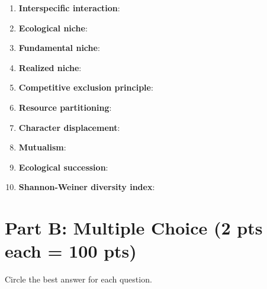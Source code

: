 \documentclass[11pt]{article}
\begin{document}
\begin{enumerate}[label=\textbf{\arabic*.}]
  \item \textbf{Interspecific interaction}: \underline{\hspace{10cm}}
        \vspace{0.5cm}
  \item \textbf{Ecological niche}: \underline{\hspace{10cm}}
        \vspace{0.5cm}
  \item \textbf{Fundamental niche}: \underline{\hspace{10cm}}
        \vspace{0.5cm}
  \item \textbf{Realized niche}: \underline{\hspace{10cm}}
        \vspace{0.5cm}
  \item \textbf{Competitive exclusion principle}: \underline{\hspace{9cm}}
        \vspace{0.5cm}
  \item \textbf{Resource partitioning}: \underline{\hspace{10cm}}
        \vspace{0.5cm}
  \item \textbf{Character displacement}: \underline{\hspace{10cm}}
        \vspace{0.5cm}
  \item \textbf{Mutualism}: \underline{\hspace{10cm}}
        \vspace{0.5cm}
  \item \textbf{Ecological succession}: \underline{\hspace{10cm}}
        \vspace{0.5cm}
  \item \textbf{Shannon-Weiner diversity index}: \underline{\hspace{9cm}}
        \vspace{0.5cm}
\end{enumerate}

\clearpage

\section*{Part B: Multiple Choice (2 pts each = 100 pts)}
Circle the best answer for each question.
\end{document}

